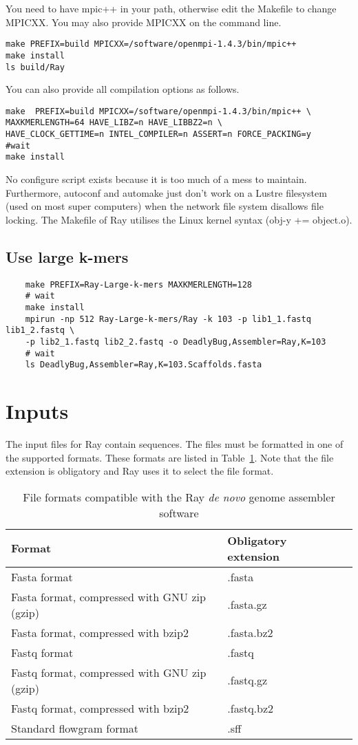 \documentclass{article}
\begin{document}
You need to have mpic++ in your path, otherwise edit the Makefile to change MPICXX.
You may also provide MPICXX on the command line.

\begin{verbatim}
make PREFIX=build MPICXX=/software/openmpi-1.4.3/bin/mpic++
make install
ls build/Ray
\end{verbatim}

You can also provide all compilation options as follows.

\begin{verbatim}
make  PREFIX=build MPICXX=/software/openmpi-1.4.3/bin/mpic++ \
MAXKMERLENGTH=64 HAVE_LIBZ=n HAVE_LIBBZ2=n \
HAVE_CLOCK_GETTIME=n INTEL_COMPILER=n ASSERT=n FORCE_PACKING=y
#wait 
make install
\end{verbatim}


No configure script exists because it is too much of a mess to maintain.
Furthermore, autoconf and automake just don't work on a Lustre filesystem (used on most
super computers) when the network file system disallows file locking.
The Makefile of Ray utilises the Linux kernel syntax (obj-y += object.o).

\subsection{Use large k-mers}

\begin{verbatim}
	make PREFIX=Ray-Large-k-mers MAXKMERLENGTH=128
	# wait
	make install
	mpirun -np 512 Ray-Large-k-mers/Ray -k 103 -p lib1_1.fastq lib1_2.fastq \
	-p lib2_1.fastq lib2_2.fastq -o DeadlyBug,Assembler=Ray,K=103
	# wait
	ls DeadlyBug,Assembler=Ray,K=103.Scaffolds.fasta
\end{verbatim}


\section{Inputs}

The input files for Ray contain sequences. The files must be formatted in one of the supported formats.
These formats are listed in Table~\ref{formats}. Note that the file extension is obligatory and Ray uses it
to select the file format.

\begin{table}[h]
\caption{File formats compatible with the Ray \emph{de novo} genome assembler software}\label{formats}
\begin{tabular}{lll}
\hline
Format & Obligatory extension \\
\hline
Fasta format & .fasta\\
Fasta format, compressed with GNU zip (gzip) & .fasta.gz \\
Fasta format, compressed with bzip2 & .fasta.bz2 \\
Fastq format & .fastq\\
Fastq format, compressed with GNU zip (gzip) & .fastq.gz \\
Fastq format, compressed with bzip2 & .fastq.bz2 \\
Standard flowgram format & .sff \\
\hline
\end{tabular}
\end{table}
\end{document}
